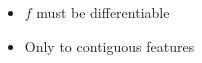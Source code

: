 \begin{itemize}
  \item \( f \) must be differentiable
  \item Only to contiguous features
\end{itemize}